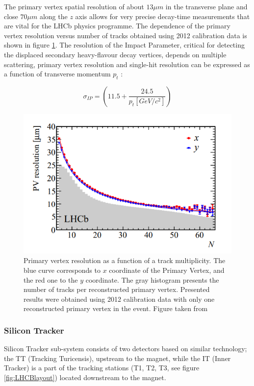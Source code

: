 The primary vertex spatial resolution of about $13 \mu m $ in the transverse plane and close $70 \mu m $ along the $z$ axis allows for very precise decay-time measurements that are vital for the LHCb physics programme. The dependence of the primary vertex resolution versus number of tracks obtained using 2012 calibration data is shown in figure \ref{fig:veloPerformance}. The resolution of the Impact Parameter, critical for detecting the displaced secondary 
heavy-flavour decay vertices, depends on  multiple scattering, primary vertex resolution and single-hit resolution can be expressed as a function of transverse momentum $p_t$ \cite{veloPerformance}: 

\begin{equation}
    \sigma_{IP} = \left( 11.5  + \frac{24.5}{p_t[GeV/c^2]} \right)
\end{equation}

\begin{figure}[h]
\centering
\includegraphics{figures/VeloResolution.PNG}
\caption{Primary vertex resolution as a function of a track multiplicity. The blue curve corresponds to $x$ coordinate of the Primary Vertex, and the red one to the $y$ coordinate. The gray histogram presents the number of tracks per reconstructed primary vertex. Presented results were obtained using 2012 calibration data with only one reconstructed primary vertex in the event. Figure taken from \cite{veloPerformance} 
\label{fig:veloPerformance}}
\end{figure}

\subsubsection{Silicon Tracker}
\label{sec:ST}
Silicon Tracker \cite{Silicon_Tracker} sub-system consists of two detectors based on similar technology; the TT (Tracking Turicensis), upstream to the magnet, while the IT (Inner Tracker) is a part of the tracking stations (T1, T2, T3, see figure \ref{fig:LHCBlayout}) located downstream to the magnet.

